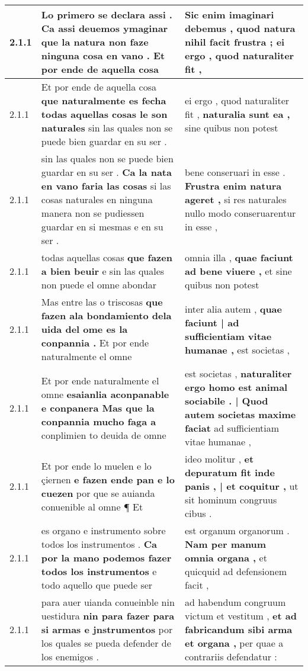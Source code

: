 \begin{tabular}{|p{1cm}|p{6.5cm}|p{6.5cm}|}
2.1.1 & Lo primero se declara assi . Ca assi deuemos ymaginar \textbf{ que la natura non faze ninguna cosa en vano . } Et por ende de aquella cosa & Sic enim imaginari debemus , \textbf{ quod natura nihil facit frustra ; } ei ergo , quod naturaliter fit , \\\hline
2.1.1 & Et por ende de aquella cosa \textbf{ que naturalmente es fecha todas aquellas cosas le son naturales } sin las quales non se puede bien guardar en su ser . & ei ergo , quod naturaliter fit , \textbf{ naturalia sunt ea , } sine quibus non potest \\\hline
2.1.1 & sin las quales non se puede bien guardar en su ser . \textbf{ Ca la nata en vano faria las cosas } si las cosas naturales en ninguna manera non se pudiessen guardar en si mesmas e en su ser . & bene conseruari in esse . \textbf{ Frustra enim natura ageret , } si res naturales nullo modo conseruarentur in esse , \\\hline
2.1.1 & todas aquellas cosas \textbf{ que fazen a bien beuir } e sin las quales non puede el omne abondar & omnia illa , \textbf{ quae faciunt ad bene viuere , } et sine quibus non potest \\\hline
2.1.1 & Mas entre las o triscosas \textbf{ que fazen ala bondamiento dela uida del ome es la conpannia . } Et por ende naturalmente el omne & inter alia autem , \textbf{ quae faciunt | ad sufficientiam vitae humanae , } est societas , \\\hline
2.1.1 & Et por ende naturalmente el omne \textbf{ esaianlia aconpanable e conpanera Mas que la conpannia mucho faga a } conplimien to deuida de omne & est societas , \textbf{ naturaliter ergo homo est animal sociabile . | Quod autem societas maxime faciat } ad sufficientiam vitae humanae , \\\hline
2.1.1 & Et por ende lo muelen e lo çiernen \textbf{ e fazen ende pan e lo cuezen } por que se auianda conuenible al omne ¶ Et & ideo molitur , \textbf{ et depuratum fit inde panis , | et coquitur , } ut sit hominum congruus cibus . \\\hline
2.1.1 & es organo e instrumento sobre todos los instrumentos . \textbf{ Ca por la mano podemos fazer todos los instrumentos } e todo aquello que puede ser & est organum organorum . \textbf{ Nam per manum omnia organa , } et quicquid ad defensionem facit , \\\hline
2.1.1 & para auer uianda conueinble nin uestidura \textbf{ nin para fazer para si armas e jnstrumentos } por los quales se pueda defender de los enemigos . & ad habendum congruum victum et vestitum , \textbf{ et ad fabricandum sibi arma et organa , } per quae a contrariis defendatur : \\\hline

\end{tabular}
